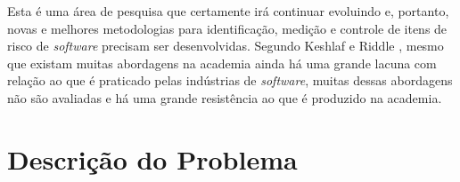 Esta é uma área de pesquisa que certamente irá continuar evoluindo e, portanto, novas e melhores metodologias para identificação, medição e controle de itens de risco de \textit{software} precisam ser desenvolvidas. Segundo Keshlaf e Riddle \cite{KESHLAFRIDDLE2010}, mesmo que existam muitas abordagens na academia ainda há uma grande lacuna com relação ao que é praticado pelas indústrias de \textit{software}, muitas dessas abordagens não são avaliadas e há uma grande resistência ao que é produzido na academia. 

\section{Descrição do Problema}

